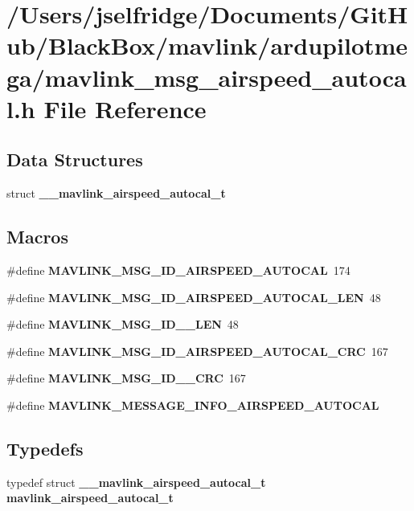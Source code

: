 \section{/\+Users/jselfridge/\+Documents/\+Git\+Hub/\+Black\+Box/mavlink/ardupilotmega/mavlink\+\_\+msg\+\_\+airspeed\+\_\+autocal.h File Reference}
\label{mavlink__msg__airspeed__autocal_8h}
\subsection*{Data Structures}
\begin{DoxyCompactItemize}
\item 
struct \textbf{ \+\_\+\+\_\+mavlink\+\_\+airspeed\+\_\+autocal\+\_\+t}
\end{DoxyCompactItemize}
\subsection*{Macros}
\begin{DoxyCompactItemize}
\item 
\#define \textbf{ M\+A\+V\+L\+I\+N\+K\+\_\+\+M\+S\+G\+\_\+\+I\+D\+\_\+\+A\+I\+R\+S\+P\+E\+E\+D\+\_\+\+A\+U\+T\+O\+C\+AL}~174
\item 
\#define \textbf{ M\+A\+V\+L\+I\+N\+K\+\_\+\+M\+S\+G\+\_\+\+I\+D\+\_\+\+A\+I\+R\+S\+P\+E\+E\+D\+\_\+\+A\+U\+T\+O\+C\+A\+L\+\_\+\+L\+EN}~48
\item 
\#define \textbf{ M\+A\+V\+L\+I\+N\+K\+\_\+\+M\+S\+G\+\_\+\+I\+D\+\_\+\_\+\+L\+EN}~48
\item 
\#define \textbf{ M\+A\+V\+L\+I\+N\+K\+\_\+\+M\+S\+G\+\_\+\+I\+D\+\_\+\+A\+I\+R\+S\+P\+E\+E\+D\+\_\+\+A\+U\+T\+O\+C\+A\+L\+\_\+\+C\+RC}~167
\item 
\#define \textbf{ M\+A\+V\+L\+I\+N\+K\+\_\+\+M\+S\+G\+\_\+\+I\+D\+\_\+\_\+\+C\+RC}~167
\item 
\#define \textbf{ M\+A\+V\+L\+I\+N\+K\+\_\+\+M\+E\+S\+S\+A\+G\+E\+\_\+\+I\+N\+F\+O\+\_\+\+A\+I\+R\+S\+P\+E\+E\+D\+\_\+\+A\+U\+T\+O\+C\+AL}
\end{DoxyCompactItemize}
\subsection*{Typedefs}
\begin{DoxyCompactItemize}
\item 
typedef struct \textbf{ \+\_\+\+\_\+mavlink\+\_\+airspeed\+\_\+autocal\+\_\+t} \textbf{ mavlink\+\_\+airspeed\+\_\+autocal\+\_\+t}
\end{DoxyCompactItemize}


